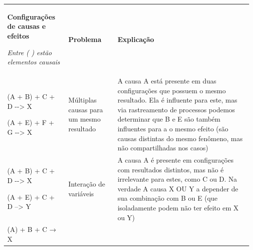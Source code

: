 \begin{longtable}[]{@{}
  >{\raggedright\arraybackslash}p{}
  >{\raggedright\arraybackslash}p{}
  >{\raggedright\arraybackslash}p{}@{}}
\toprule\noalign{}
\begin{minipage}[b]{\linewidth}\raggedright
\textbf{Configurações de causas e efeitos}

\emph{Entre ( ) estão elementos causais}
\end{minipage} & \begin{minipage}[b]{\linewidth}\raggedright
\textbf{Problema}
\end{minipage} & \begin{minipage}[b]{\linewidth}\raggedright
\textbf{Explicação}
\end{minipage} \\
\begin{minipage}[b]{\linewidth}\raggedright
(A + B) + C + D -\/-\textgreater{} X

(A + E) + F + G -\/-\textgreater{} X
\end{minipage} & \begin{minipage}[b]{\linewidth}\raggedright
Múltiplas causas para um mesmo resultado
\end{minipage} & \begin{minipage}[b]{\linewidth}\raggedright
A causa A está presente em duas configurações que possuem o mesmo
resultado. Ela é influente para este, mas via rastreamento de processos
podemos determinar que B e E são também influentes para a o mesmo efeito
(são causas distintas do mesmo fenômeno, mas não compartilhadas nos
casos)
\end{minipage} \\
\begin{minipage}[b]{\linewidth}\raggedright
(A + B) + C + D -\/-\textgreater{} X

(A + E) + C + D --\textgreater{} Y
\end{minipage} & \begin{minipage}[b]{\linewidth}\raggedright
Interação de variáveis
\end{minipage} & \begin{minipage}[b]{\linewidth}\raggedright
A causa A é presente em configurações com resultados distintos, mas não
é irrelevante para estes, como C ou D. Na verdade A causa X OU Y a
depender de sua combinação com B ou E (que isoladamente podem não ter
efeito em X ou Y)
\end{minipage} \\
\begin{minipage}[b]{\linewidth}\raggedright
(A) + B + C → X


\end{minipage}
\end{longtable}
